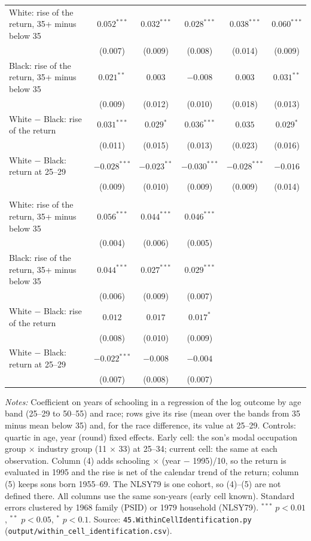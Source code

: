 \begin{table}[!htbp]
{{\begin{tabular}{lccccc}
White: rise of the return, 35+ minus below 35 & $0.052^{***}$ & $0.032^{***}$ & $0.028^{***}$ & $0.038^{***}$ & $0.060^{***}$ \\
 & (0.007) & (0.009) & (0.008) & (0.014) & (0.009) \\
Black: rise of the return, 35+ minus below 35 & $0.021^{**}$ & $0.003$ & $-0.008$ & $0.003$ & $0.031^{**}$ \\
 & (0.009) & (0.012) & (0.010) & (0.018) & (0.013) \\
White $-$ Black: rise of the return & $0.031^{***}$ & $0.029^{*}$ & $0.036^{***}$ & $0.035$ & $0.029^{*}$ \\
 & (0.011) & (0.015) & (0.013) & (0.023) & (0.016) \\
White $-$ Black: return at 25--29 & $-0.028^{***}$ & $-0.023^{**}$ & $-0.030^{***}$ & $-0.028^{***}$ & $-0.016$ \\
 & (0.009) & (0.010) & (0.009) & (0.009) & (0.014) \\
\addlinespace
\multicolumn{6}{l}{\textit{NLSY79, log hourly rate of pay}} \\
White: rise of the return, 35+ minus below 35 & $0.056^{***}$ & $0.044^{***}$ & $0.046^{***}$ &  &  \\
 & (0.004) & (0.006) & (0.005) &  &  \\
Black: rise of the return, 35+ minus below 35 & $0.044^{***}$ & $0.027^{***}$ & $0.029^{***}$ &  &  \\
 & (0.006) & (0.009) & (0.007) &  &  \\
White $-$ Black: rise of the return & $0.012$ & $0.017$ & $0.017^{*}$ &  &  \\
 & (0.008) & (0.010) & (0.009) &  &  \\
White $-$ Black: return at 25--29 & $-0.022^{***}$ & $-0.008$ & $-0.004$ &  &  \\
 & (0.007) & (0.008) & (0.007) &  &  \\
\bottomrule
\end{tabular}}}
\par\smallskip
\begin{minipage}{\textwidth}\footnotesize \textit{Notes:} Coefficient on years of schooling in a regression of the log outcome by age band (25--29 to 50--55) and race; rows give its rise (mean over the bands from 35 minus mean below 35) and, for the race difference, its value at 25--29. Controls: quartic in age, year (round) fixed effects. Early cell: the son's modal occupation group $\times$ industry group (11 $\times$ 33) at 25--34; current cell: the same at each observation. Column (4) adds schooling $\times$ (year $-$ 1995)/10, so the return is evaluated in 1995 and the rise is net of the calendar trend of the return; column (5) keeps sons born 1955--69. The NLSY79 is one cohort, so (4)--(5) are not defined there. All columns use the same son-years (early cell known). Standard errors clustered by 1968 family (PSID) or 1979 household (NLSY79). $^{***}$ $p<0.01$, $^{**}$ $p<0.05$, $^{*}$ $p<0.1$. Source: \texttt{45.WithinCellIdentification.py} (\texttt{output/within\_cell\_identification.csv}).\end{minipage}
\end{table}
